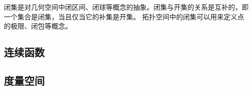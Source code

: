 \begin{note}
    闭集是对几何空间中闭区间、闭球等概念的抽象。闭集与开集的关系是互补的，即一个集合是闭集，当且仅当它的补集是开集。
    拓扑空间中的闭集可以用来定义点的极限、闭包等概念。
\end{note}

\vspace{1em}

\subsection{连续函数}

\subsection{度量空间}


\newpage